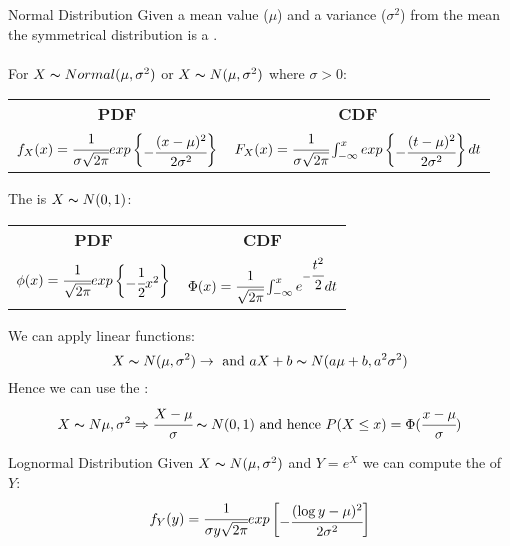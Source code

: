 \begin{definitionbox}{Normal Distribution}
	Given a mean value ($\mu$) and a variance ($\sigma^2$) from the mean the symmetrical distribution is a .
	\\
	\\ For $X \thicksim Normal(\mu, \sigma^2)$ or $X \thicksim N(\mu, \sigma^2)$ where $\sigma > 0$:
	\begin{center}
		\begin{tabular}{c | c }
			\textbf{PDF}                                                            & \textbf{CDF}                                                                                \\
			$f_X(x) = \cfrac{1}{\sigma \sqrt{2 \pi}}exp \begin{Bmatrix}
					-\cfrac{(x - \mu)^2}{2\sigma^2} \\
				\end{Bmatrix}$ & $F_X(x) = \cfrac{1}{\sigma \sqrt{2 \pi}} \int_{-\infty}^x exp\begin{Bmatrix}
					- \cfrac{(t - \mu)^2}{2 \sigma^2}
				\end{Bmatrix} dt$ \\
		\end{tabular}
	\end{center}
	The  is $X \thicksim N(0, 1)$:
	\begin{center}
		\begin{tabular}{c | c }
			\textbf{PDF}                                                      & \textbf{CDF}                                                                \\
			$\phi(x) = \cfrac{1}{\sqrt{2 \pi}}exp \begin{Bmatrix}
					- \cfrac{1}{2}x^2
				\end{Bmatrix}$ & $\Phi(x) =  \cfrac{1}{\sqrt{2 \pi}} \int_{-\infty}^xe^{-\cfrac{t^2}{2}} dt$ \\
		\end{tabular}
	\end{center}
	We can apply linear functions:
	\[X \thicksim N(\mu, \sigma^2) \rightarrow \text{ and } aX + b \thicksim N(a \mu + b, a^2\sigma^2)\]
	Hence we can use the :
	\[X \thicksim N{\mu, \sigma^2} \Rightarrow \cfrac{X - \mu}{\sigma} \thicksim N(0,1) \text{ and hence } P(X \leq x) = \Phi(\cfrac{x - \mu}{\sigma})\]
\end{definitionbox}
\begin{definitionbox}{Lognormal Distribution}
	Given $X \thicksim N(\mu, \sigma^2)$ and $Y = e^X$ we can compute the  of $Y$:
	\[f_Y(y) = \cfrac{1}{\sigma y \sqrt{2 \pi}} exp \begin{bmatrix}
			- \cfrac{(\log y - \mu)^2}{2 \sigma^2}
		\end{bmatrix}\]
\end{definitionbox}

